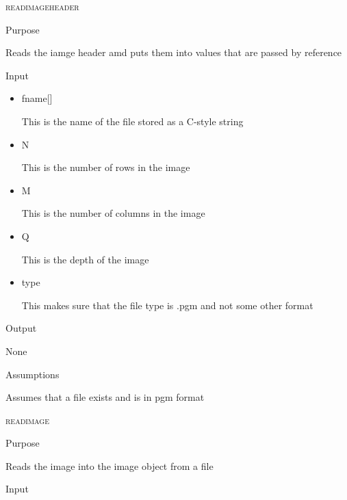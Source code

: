 \documentclass[pdftex, 11pt]{article}
\begin{document}
\begin{description}
	\item{\textsc{readimageheader}}
		\begin{description}
			\item{Purpose}

				Reads the iamge header amd puts them into values that
				are passed by reference

			\item{Input}

				\begin{itemize}

					\item{fname[]}

						This is the name of the file stored
						as a C-style string

					\item{N}

						This is the number of rows in the image

					\item{M}

						This is the number of columns in
						the image

					\item{Q}

						This is the depth of the image

					\item{type}

						This makes sure that the file type is
						.pgm and not some other format
						
				\end{itemize}
						
						
			\item{Output}

				None

			\item{Assumptions}

				Assumes that a file exists and is in pgm format

		\end{description}


	\item{\textsc{readimage}}
		\begin{description}
			\item{Purpose}

				Reads the image into the image object from a file

			\item{Input}

				\begin{itemize}


\end{itemize}
\end{description}
\end{description}
\end{document}
